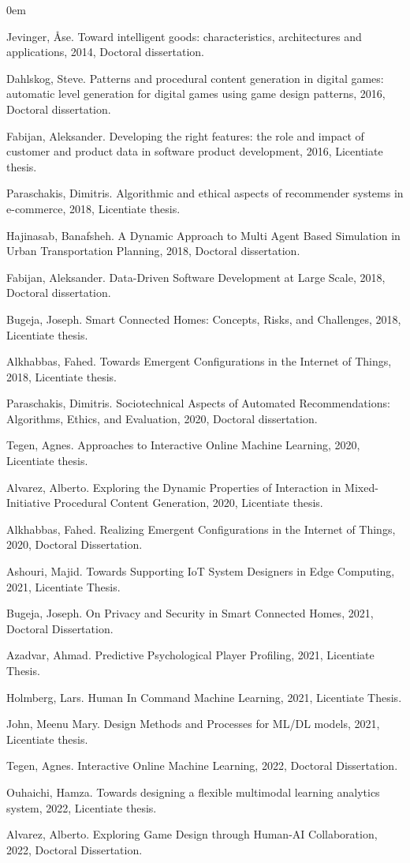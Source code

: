 \documentclass[hidelinks,green,onecolumn,twoside]{dissertation}
\newcommand{\myMainTitle}{Exploring Game Design through Human-AI Collaboration}
\newcommand{\graduationYear}{2022}
\begin{document}
\begin{otherTheses}
\itemsep0em 
    \item Jevinger, Åse. Toward intelligent goods: characteristics, architectures and applications, 2014, Doctoral dissertation.
    \item Dahlskog, Steve. Patterns and procedural content generation in digital games: automatic level generation for digital games using game design patterns, 2016, Doctoral dissertation.
    \item Fabijan, Aleksander. Developing the right features: the role and impact of customer and product data in software product development, 2016, Licentiate thesis.
    \item Paraschakis, Dimitris. Algorithmic and ethical aspects of recommender systems in e-commerce, 2018, Licentiate thesis.
    \item \sloppy Hajinasab, Banafsheh. A Dynamic Approach to Multi Agent Based Simulation in Urban Transportation Planning, 2018, Doctoral dissertation.
    \item Fabijan, Aleksander. Data-Driven Software Development at Large Scale, 2018, Doctoral dissertation.
    \item Bugeja, Joseph. Smart Connected Homes: Concepts, Risks, and Challenges, 2018, Licentiate thesis.
    \item Alkhabbas, Fahed. Towards Emergent Configurations in the Internet of Things, 2018, Licentiate thesis.
    \item Paraschakis, Dimitris. Sociotechnical Aspects of Automated Recommendations: Algorithms, Ethics, and Evaluation, 2020, Doctoral dissertation.
    \item Tegen, Agnes. Approaches to Interactive Online Machine Learning, 2020, Licentiate thesis.
    \item Alvarez, Alberto. Exploring the Dynamic Properties of Interaction in Mixed-Initiative Procedural Content Generation, 2020, Licentiate thesis.
    \item Alkhabbas, Fahed. Realizing Emergent Configurations in the Internet of Things, 2020, Doctoral Dissertation.
    \item Ashouri, Majid. Towards Supporting IoT System Designers in Edge Computing, 2021, Licentiate Thesis.
    \item Bugeja, Joseph. On Privacy and Security in Smart Connected Homes, 2021, Doctoral Dissertation.
    \item Azadvar, Ahmad. Predictive Psychological Player Profiling, 2021, Licentiate Thesis.
    \item Holmberg, Lars. Human In Command Machine Learning, 2021, Licentiate Thesis.
    \item John, Meenu Mary. Design Methods and Processes for ML/DL models, 2021, Licentiate thesis.
    \item Tegen, Agnes. Interactive Online Machine Learning, 2022, Doctoral Dissertation.
    \item Ouhaichi, Hamza. Towards designing a flexible multimodal learning analytics system, 2022, Licentiate thesis.
    \item Alvarez, Alberto. \myMainTitle, \graduationYear, Doctoral Dissertation.
\end{otherTheses}
\end{document}
